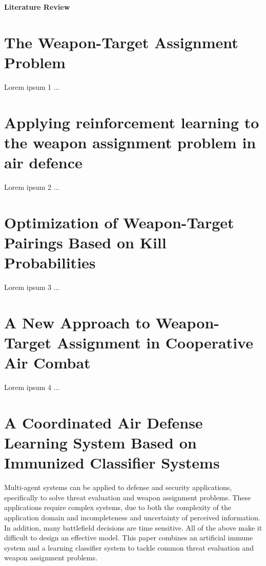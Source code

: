\documentclass[12pt]{article} %
\begin{document}
 
\begin{center}
\textbf{Literature Review}
\end{center}
\bigskip

\section*{The Weapon-Target Assignment Problem \\ \cite{wtap_kline_2019}}
Lorem ipsum 1 $\ldots$


\section*{Applying reinforcement learning to the weapon assignment problem in air defence \cite{rl_wa_airDefence_mouton_2011}}
Lorem ipsum 2 $\ldots$


\section*{Optimization of Weapon-Target Pairings Based on Kill Probabilities \cite{killProbs_bogdanowicz_2013}}
Lorem ipsum 3 $\ldots$


\section*{A New Approach to Weapon-Target Assignment in Cooperative Air Combat \cite{swarmHarmony_chang_2017}}
Lorem ipsum 4 $\ldots$


\section*{A Coordinated Air Defense Learning System Based on Immunized Classifier Systems \cite{immunized_nantogma_2021}}
    
    Multi-agent systems can be applied to defense and security applications, specifically to solve threat evaluation and weapon assignment problems. These applications require complex systems, due to both the complexity of the application domain and incompleteness and uncertainty of perceived information. In addition, many battlefield decisions are time sensitive. All of the above make it difficult to design an effective model. This paper combines an artificial immune system and a learning classifier system to tackle common threat evaluation and weapon assignment problems. 
    
\end{document}
